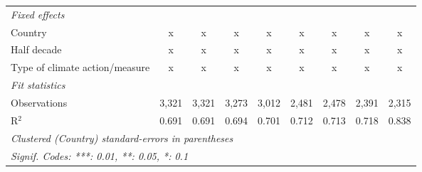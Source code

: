 \begin{table}[htbp]
\begin{tabular}{lcccccccc}
      \emph{Fixed effects}\\
      Country                                                             & x            & x            & x            & x           & x            & x            & x           & x\\  
      Half decade                                                         & x            & x            & x            & x           & x            & x            & x           & x\\  
      Type of climate action/measure                                      & x            & x            & x            & x           & x            & x            & x           & x\\  
      \midrule \emph{Fit statistics}\\
      Observations                                                        & 3,321        & 3,321        & 3,273        & 3,012       & 2,481        & 2,478        & 2,391       & 2,315\\  
      R$^2$                                                               & 0.691        & 0.691        & 0.694        & 0.701       & 0.712        & 0.713        & 0.718       & 0.838\\  
      \midrule
      \multicolumn{9}{l}{\emph{Clustered (Country) standard-errors in parentheses}}\\
      \multicolumn{9}{l}{\emph{Signif. Codes: ***: 0.01, **: 0.05, *: 0.1}}\\
   \end{tabular}
\end{table}


